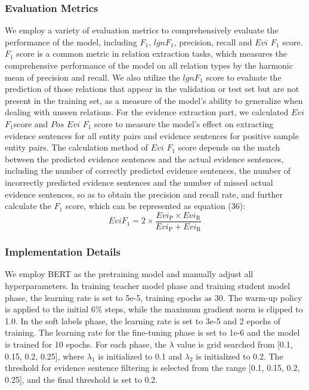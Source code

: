 \documentclass[preprint,12pt]{elsarticle}
\begin{document}
\subsubsection{Evaluation Metrics}\label{subsubsec8}
We employ a variety of evaluation metrics to comprehensively evaluate the performance of the model, including $F_1$, $lgn F_1$, precision, recall and $Evi$ $F_1$ score. $F_1$ score is a common metric in relation extraction tasks, which measures the comprehensive performance of the model on all relation types by the harmonic mean of precision and recall. We also utilize the $lgn F_1$ score to evaluate the prediction of those relations that appear in the validation or test set but are not present in the training set, as a measure of the model's ability to generalize when dealing with unseen relations. For the evidence extraction part, we calculated $Evi$ $F_1$score and $Pos$ $Evi$ $F_1$ score to measure the model's effect on extracting evidence sentences for all entity pairs and evidence sentences for positive sample entity pairs. The calculation method of  $Evi$ $F_1$ score depends on the match between the predicted evidence sentences and the actual evidence sentences, including the number of correctly predicted evidence sentences, the number of incorrectly predicted evidence sentences and the number of missed actual evidence sentences, so as to obtain the precision and recall rate, and further calculate the $F_1$  score, which can be represented as equation (36):
\begin{equation}
{E v i F_1=2 \times \frac{E v i_{\mathrm{P}} \times E v i_{\mathrm{R}}}{E v i_{\mathrm{P}}+E v i_{\mathrm{R}}}}
\label{eq33}
\end{equation}

\subsubsection{Implementation Details}\label{subsubsec8}
We employ BERT as the pretraining model and manually adjust all hyperparameters. In training teacher model phase and training student model phase, the learning rate is set to 5e-5, training epochs as 30. The warm-up policy is applied to the initial 6\% steps, while the maximum gradient norm is clipped to 1.0. In the soft labels phase, the learning rate is set to 3e-5 and 2 epochs of training. The learning rate for the fine-tuning phase is set to 1e-6 and the model is trained for 10 epochs. For each phase, the $\lambda$ value is grid searched from [0.1, 0.15, 0.2, 0.25], where $\lambda_1$ is initialized to 0.1 and $\lambda_2$ is initialized to 0.2. The threshold for evidence sentence filtering is selected from the range [0.1, 0.15, 0.2, 0.25], and the final threshold is set to 0.2. 
\end{document}
